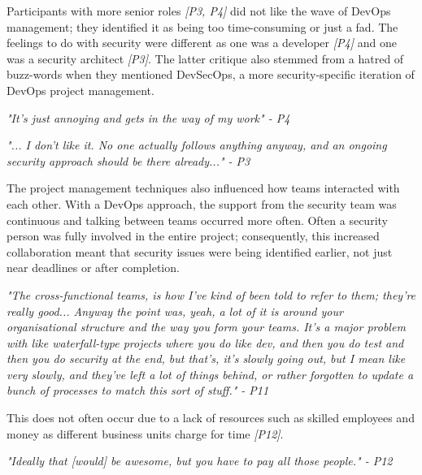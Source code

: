 \newline
\par 
Participants with more senior roles \textit{[P3, P4]} did not like the wave of DevOps management; they identified it as being too time-consuming or just a fad. The feelings to do with security were different as one was a developer \textit{[P4]} and one was a security architect \textit{[P3]}. The latter critique also stemmed from a hatred of buzz-words when they mentioned DevSecOps, a more security-specific iteration of DevOps project management.
\newline
\par \textit{"It's just annoying and gets in the way of my work" - P4}
\newline
\par \textit{"... I don't like it. No one actually follows anything anyway, and an ongoing security approach should be there already..." - P3}
\newline
\par 
The project management techniques also influenced how teams interacted with each other. With a DevOps approach, the support from the security team was continuous and talking between teams occurred more often. Often a security person was fully involved in the entire project; consequently, this increased collaboration meant that security issues were being identified earlier, not just near deadlines or after completion. 
\newline
\par 
\textit{"The cross-functional teams, is how I've kind of been told to refer to them; they're really good... Anyway the point was, yeah, a lot of it is around your organisational structure and the way you form your teams. It's a major problem with like waterfall-type projects where you do like dev, and then you do test and then you do security at the end, but that's, it's slowly going out, but I mean like very slowly, and they've left a lot of things behind, or rather forgotten to update a bunch of processes to match this sort of stuff." - P11}
\newline
\par
This does not often occur due to a lack of resources such as skilled employees and money as different business units charge for time \textit{[P12]}. 
\newline
\par
\textit{"Ideally that [would] be awesome, but you have to pay all those people." - P12 }


